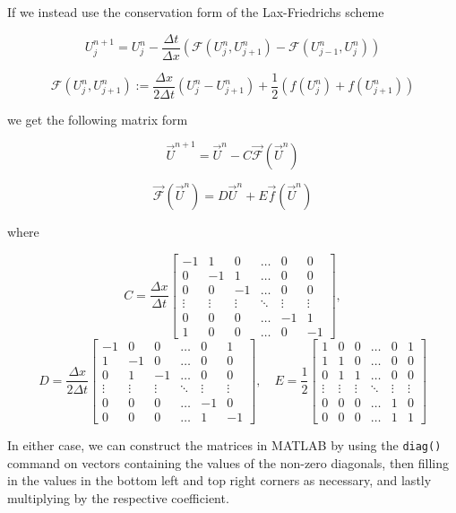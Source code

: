 \documentclass{myproject}
\begin{document}
If we instead use the conservation form of the Lax-Friedrichs scheme

\[
    U_j^{n+1} = U_j^n - \frac{\Delta t}{\Delta x} \left( \mathcal{F}(U_{j}^{n}, U_{j+1}^{n}) - \mathcal{F}(U_{j-1}^{n}, U_{j}^{n}) \right)
\]

\[
    \mathcal{F}(U_j^n, U_{j+1}^n) := \frac{\Delta x}{2 \Delta t}(U_j^n - U_{j+1}^n) + \frac{1}{2}\left( f(U_j^n) + f(U_{j+1}^n) \right)
\]

we get the following matrix form

\[
\vec{U}^{n+1} = \vec{U}^{n} - C\vec{\mathcal{F}}(\vec{U}^{n})
\]

\[
\vec{\mathcal{F}}(\vec{U}^{n}) = D\vec{U}^{n} + E\vec{f}(\vec{U}^{n})
\]

where

\[
C = \frac{\Delta x}{\Delta t}
\begin{bmatrix}
-1 & 1 & 0 & \dots & 0 & 0 \\
0 & -1 & 1 & \dots & 0 & 0 \\
0 & 0 & -1 & \dots & 0 & 0 \\
\vdots & \vdots & \vdots & \ddots & \vdots & \vdots \\
0 & 0 & 0 & \dots & -1 & 1 \\
1 & 0 & 0 & \dots & 0 & -1
\end{bmatrix},
\]
\[
D = \frac{\Delta x}{2 \Delta t}
\begin{bmatrix}
-1 & 0 & 0 & \dots & 0 & 1 \\
1 & -1 & 0 & \dots & 0 & 0 \\
0 & 1 & -1 & \dots & 0 & 0 \\
\vdots & \vdots & \vdots & \ddots & \vdots & \vdots \\
0 & 0 & 0 & \dots & -1 & 0 \\
0 & 0 & 0 & \dots & 1 & -1
\end{bmatrix},
\quad
E = \frac{1}{2}
\begin{bmatrix}
1 & 0 & 0 & \dots & 0 & 1 \\
1 & 1 & 0 & \dots & 0 & 0 \\
0 & 1 & 1 & \dots & 0 & 0 \\
\vdots & \vdots & \vdots & \ddots & \vdots & \vdots \\
0 & 0 & 0 & \dots & 1 & 0 \\
0 & 0 & 0 & \dots & 1 & 1
\end{bmatrix}
\]

In either case, we can construct the matrices in MATLAB by using the \texttt{diag()} command on vectors containing the values of the non-zero diagonals, then filling in the values in the bottom left and top right corners as necessary, and lastly multiplying by the respective coefficient.
\end{document}
